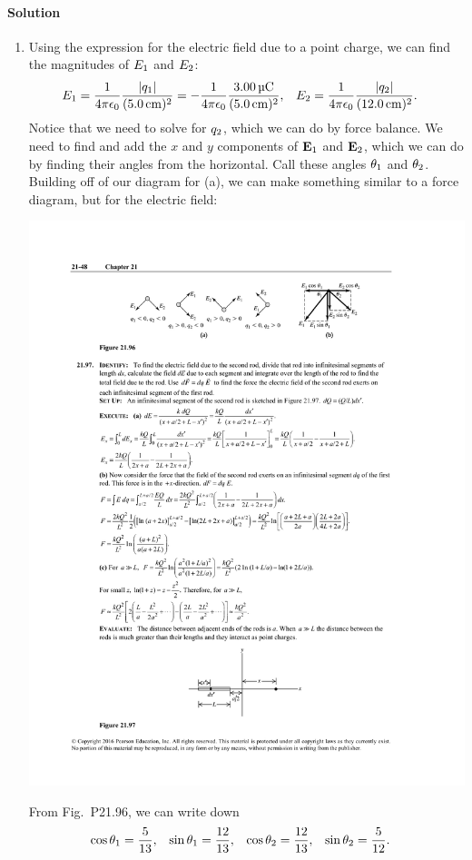 \documentclass[11pt]{article}
\newenvironment{solution}
{
    \paragraph{Solution}
    \ignorespaces
}
{
    \bigskip
}
\begin{document}
\begin{solution}
\begin{enumerate}
		\item Using the expression for the electric field due to a point charge, we can find the magnitudes of $E_1$ and $E_2$:
		\begin{align*}
			\Eq &= \fk \frac{\abs{\qq}}{(\SI{5.0}{\cm})^2} = -\fk \frac{\SI{3.00}{\micro\coulomb}}{(\SI{5.0}{\cm})^2}, &
			\Ew &= \fk \frac{\abs{\qw}}{(\SI{12.0}{\cm})^2}.
		\end{align*}
		Notice that we need to solve for $q_2$, which we can do by force balance.  We need to find and add the $x$ and $y$ components of $\mathbf{E}_1$ and $\mathbf{E}_2$, which we can do by finding their angles from the horizontal.  Call these angles $\theta_1$ and $\theta_2$.  Building off of our diagram for (a), we can make something similar to a force diagram, but for the electric field:
		
		\begin{center}
			\includegraphics[scale=1.5]{P21-96b}
		\end{center}
		
		From Fig.~P21.96, we can write down
		\begin{align*}
			\cos\theta_1 &= \frac{5}{13}, &
			\sin\theta_1 &= \frac{12}{13}, &
			\cos\theta_2 &= \frac{12}{13}, &
			\sin\theta_2 &= \frac{5}{12}.
		\end{align*}
		

\end{enumerate}
\end{solution}
\end{document}

